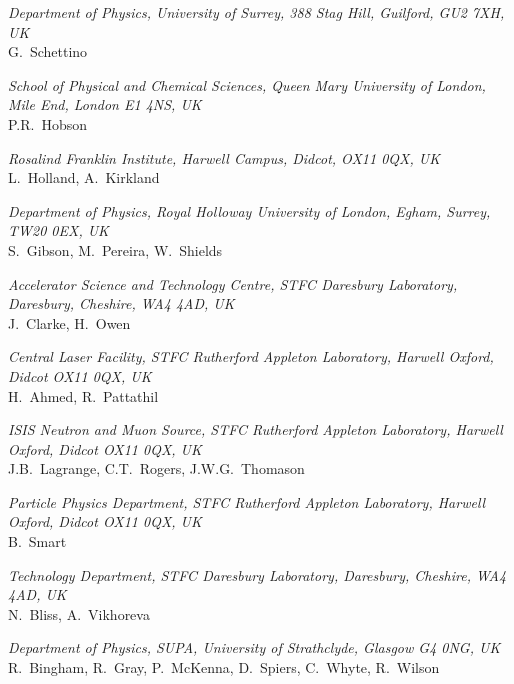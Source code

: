 \vspace{0.5cm}
\noindent \textit{Department of Physics, University of Surrey, 388 Stag Hill, Guilford, GU2 7XH, UK} \\
G.~Schettino
 
\vspace{0.5cm}
\noindent \textit{School of Physical and Chemical Sciences, Queen Mary University of London, Mile End, London E1 4NS, UK} \\
P.R.~Hobson
 
\vspace{0.5cm}
\noindent \textit{Rosalind Franklin Institute, Harwell Campus, Didcot, OX11 0QX, UK} \\
L.~Holland, A.~Kirkland
 
\vspace{0.5cm}
\noindent \textit{Department of Physics, Royal Holloway University of London, Egham, Surrey, TW20 0EX, UK} \\
S.~Gibson, M.~Pereira, W.~Shields
 
\vspace{0.5cm}
\noindent \textit{Accelerator Science and Technology Centre, STFC Daresbury Laboratory, Daresbury, Cheshire, WA4 4AD, UK} \\
J.~Clarke, H.~Owen
 
\vspace{0.5cm}
\noindent \textit{Central Laser Facility, STFC Rutherford Appleton Laboratory, Harwell Oxford, Didcot OX11 0QX, UK} \\
H.~Ahmed, R.~Pattathil
 
\vspace{0.5cm}
\noindent \textit{ISIS Neutron and Muon Source, STFC Rutherford Appleton Laboratory, Harwell Oxford, Didcot OX11 0QX, UK} \\
J.B.~Lagrange, C.T.~Rogers, J.W.G.~Thomason
 
\vspace{0.5cm}
\noindent \textit{Particle Physics Department, STFC Rutherford Appleton Laboratory, Harwell Oxford, Didcot OX11 0QX, UK} \\
B.~Smart
 
\vspace{0.5cm}
\noindent \textit{Technology Department, STFC Daresbury Laboratory, Daresbury, Cheshire, WA4 4AD, UK} \\
N.~Bliss, A.~Vikhoreva
 
\vspace{0.5cm}
\noindent \textit{Department of Physics, SUPA, University of Strathclyde, Glasgow G4 0NG, UK} \\
R.~Bingham, R.~Gray, P.~McKenna, D.~Spiers, C.~Whyte, R.~Wilson
 
